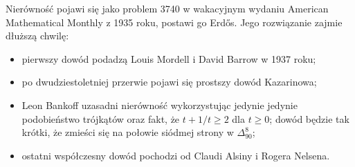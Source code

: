 \begin{figure}[H]
\begin{minipage}[b]{.45\linewidth}
\begin{center}
\begin{comment}
    \tkzLabelPoint[below left](A){$A$}
    \tkzLabelPoint[below right](B){$B$}
    \tkzLabelPoint[above](C){$C$}
    \tkzLabelPoint[above right](Pa){$A_p$}
    \tkzLabelPoint[above left](Pb){$B_p$}
    \tkzLabelPoint[below](Pc){$C_p$}

    \tkzMarkAngle[arc=lll,size=1.2,mark=|||](A,P,Pc)
    \tkzMarkAngle[arc=lll,size=1.2,mark=|||](Pc,P,B)
    \tkzMarkAngle[arc=ll,size=1.2,mark=||](B,P,Pa)
    \tkzMarkAngle[arc=ll,size=1.2,mark=||](Pa,P,C)
    \tkzMarkAngle[arc=l,size=1.2,mark=|](C,P,Pb)
    \tkzMarkAngle[arc=l,size=1.2,mark=|](Pb,P,A)

    \tkzDrawSegments[line width=0.2mm](P,A P,B P,C)
    \tkzDrawSegments[line width=0.2mm,dashed](P,Pa P,Pb P,Pc)
    \tkzDrawPolygon[line width=0.3mm](A,B,C)
    \tkzDrawPoints[size=3,color=black,fill=black!50](A,B,C,P,Pc,Pb,Pa)
\end{tikzpicture}
\end{comment}
    \end{center}
    \label{erdos_mordell_barrowb}
\end{minipage}
\caption{}
\end{figure}

\label{subsection_erdos_mordell}
Nierówność pojawi się jako problem 3740 w wakacyjnym wydaniu American Mathematical Monthly z 1935 roku, postawi go Erdős.
%
Jego rozwiązanie zajmie dłuższą chwilę:
\begin{itemize}
\item pierwszy dowód podadzą Louis Mordell i David Barrow \cite{mordell_barrow_1937} w 1937 roku;
%
%
\item po dwudziestoletniej przerwie pojawi się prostszy dowód Kazarinowa;
\item Leon Bankoff uzasadni nierówność wykorzystując jedynie jedynie podobieństwo trójkątów oraz fakt, że $t + 1/t \ge 2$ dla $t \ge 0$; dowód będzie tak krótki, że zmieści się na połowie siódmej strony w $\Delta_{90}^8$;
\item ostatni współczesny dowód pochodzi od Claudi Alsiny i Rogera Nelsena.
\end{itemize}

